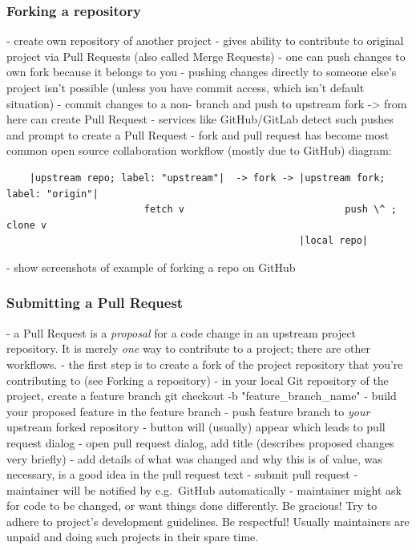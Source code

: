 \documentclass{git_course}
\begin{document}
\begin{frame}[fragile]
    \frametitle{Forking a repository}

    - create own repository of another project
    - gives ability to contribute to original project via Pull Requests
    (also called Merge Requests)
    - one can push changes to own fork because it belongs to you
    - pushing changes directly to someone else's project isn't possible
    (unless you have commit access, which isn't default situation)
    - commit changes to a non- branch and push to upstream fork ->
    from here can create Pull Request
    - services like GitHub/GitLab detect such pushes and prompt to create a
    Pull Request
    - fork and pull request has become most common open source collaboration
    workflow (mostly due to GitHub)
    diagram:
    \begin{verbatim}
    |upstream repo; label: "upstream"|  -> fork -> |upstream fork; label: "origin"|
                        fetch v                            push \^ ; clone v
                                                   |local repo|
    \end{verbatim}

    - show screenshots of example of forking a repo on GitHub
\end{frame}

\begin{frame}
    \frametitle{Submitting a Pull Request}
    - a Pull Request is a \emph{proposal} for a code change in an upstream
    project repository.  It is merely \emph{one} way to contribute to a
    project; there are other workflows.
    - the first step is to create a fork of the project repository that
    you're contributing to (see Forking a repository)
    - in your local Git repository of the project, create a feature branch
    git checkout -b "feature\_branch\_name"
    - build your proposed feature in the feature branch
    - push feature branch to \emph{your} upstream forked repository
    - button will (usually) appear which leads to pull request dialog
    - open pull request dialog, add title (describes proposed changes very
    briefly)
    - add details of what was changed and why this is of value, was
    necessary, is a good idea in the pull request text
    - submit pull request
    - maintainer will be notified by e.g.\ GitHub automatically
    - maintainer might ask for code to be changed, or want things done
    differently. Be gracious! Try to adhere to project's development
    guidelines. Be respectful! Usually maintainers are unpaid and doing such
    projects in their spare time.
\end{frame}
\end{document}
